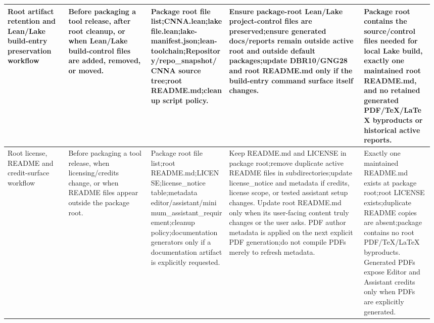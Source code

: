\begin{longtable}{L{0.14\linewidth} L{0.19\linewidth} L{0.18\linewidth} L{0.31\linewidth} L{0.16\linewidth}}
Root artifact retention and Lean/\allowbreak{}Lake build-entry preservation workflow & Before packaging a tool release, after root cleanup, or when Lean/\allowbreak{}Lake build-control files are added, removed, or moved. & Package root file list;\newline CNNA.lean;\newline lakefile.lean;\newline lake-manifest.json;\newline lean-toolchain;\newline Repository/\allowbreak{}repo\_snapshot/\allowbreak{}CNNA source tree;\newline root README.md;\newline cleanup script policy. & Ensure package-root Lean/\allowbreak{}Lake project-control files are preserved;\newline ensure generated docs/\allowbreak{}reports remain outside active root and outside default packages;\newline update DBR10/\allowbreak{}GNG28 and root README.md only if the build-entry command surface itself changes. & Package root contains the source/\allowbreak{}control files needed for local Lake build, exactly one maintained root README.md, and no retained generated PDF/\allowbreak{}TeX/\allowbreak{}LaTeX byproducts or historical active reports.\\
\hline
\addlinespace[0.24em]
Root license, README and credit-surface workflow & Before packaging a tool release, when licensing/\allowbreak{}credits change, or when README files appear outside the package root. & Package root file list;\newline root README.md;\newline LICENSE;\newline license\_notice table;\newline metadata editor/\allowbreak{}assistant/\allowbreak{}minimum\_assistant\_requirement;\newline cleanup policy;\newline documentation generators only if a documentation artifact is explicitly requested. & Keep README.md and LICENSE in package root;\newline remove duplicate active README files in subdirectories;\newline update license\_notice and metadata if credits, license scope, or tested assistant setup changes. Update root README.md only when its user-facing content truly changes or the user asks. PDF author metadata is applied on the next explicit PDF generation;\newline do not compile PDFs merely to refresh metadata. & Exactly one maintained README.md exists at package root;\newline root LICENSE exists;\newline duplicate README copies are absent;\newline package contains no root PDF/\allowbreak{}TeX/\allowbreak{}LaTeX byproducts. Generated PDFs expose Editor and Assistant credits only when PDFs are explicitly generated.\\

\end{longtable}
